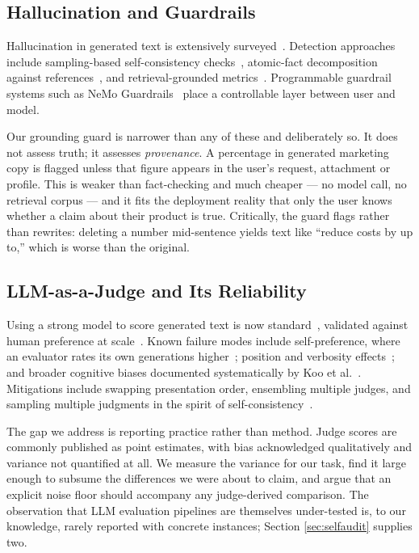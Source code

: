 \documentclass[journal]{IEEEtran}
\begin{document}
\subsection{Hallucination and Guardrails}
Hallucination in generated text is extensively
surveyed~\cite{ji2023hallucination}. Detection approaches include
sampling-based self-consistency checks~\cite{manakul2023selfcheckgpt},
atomic-fact decomposition against references~\cite{min2023factscore}, and
retrieval-grounded metrics~\cite{es2024ragas}. Programmable guardrail systems
such as NeMo Guardrails~\cite{rebedea2023nemo} place a controllable layer
between user and model.

Our grounding guard is narrower than any of these and deliberately so. It does
not assess truth; it assesses \emph{provenance}. A percentage in generated
marketing copy is flagged unless that figure appears in the user's request,
attachment or profile. This is weaker than fact-checking and much cheaper ---
no model call, no retrieval corpus --- and it fits the deployment reality that
only the user knows whether a claim about their product is true. Critically, the
guard flags rather than rewrites: deleting a number mid-sentence yields text
like ``reduce costs by up to,'' which is worse than the original.

\subsection{LLM-as-a-Judge and Its Reliability}
Using a strong model to score generated text is now
standard~\cite{zheng2023judging, liu2023geval}, validated against human
preference at scale~\cite{chiang2024arena}. Known failure modes include
self-preference, where an evaluator rates its own
generations higher~\cite{panickssery2024selfpref}; position and verbosity
effects~\cite{wang2023fair}; and broader cognitive biases documented
systematically by Koo et al.~\cite{koo2023benchmarking}. Mitigations include
swapping presentation order, ensembling multiple judges, and sampling multiple
judgments in the spirit of self-consistency~\cite{wang2023selfconsistency}.

The gap we address is reporting practice rather than method. Judge scores are
commonly published as point estimates, with bias acknowledged qualitatively and
variance not quantified at all. We measure the variance for our task, find it
large enough to subsume the differences we were about to claim, and argue that
an explicit noise floor should accompany any judge-derived comparison. The
observation that LLM evaluation pipelines are themselves under-tested is, to
our knowledge, rarely reported with concrete instances; Section
\ref{sec:selfaudit} supplies two.
\end{document}

